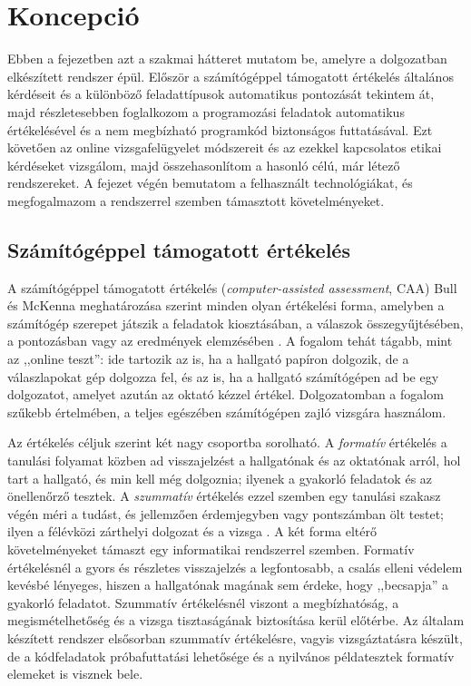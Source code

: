 \chapter{Koncepció}
\label{ch:koncepcio}

Ebben a fejezetben azt a szakmai hátteret mutatom be, amelyre a dolgozatban elkészített rendszer
épül. Először a számítógéppel támogatott értékelés általános kérdéseit és a különböző
feladattípusok automatikus pontozását tekintem át, majd részletesebben foglalkozom a programozási
feladatok automatikus értékelésével és a nem megbízható programkód biztonságos futtatásával.
Ezt követően az online vizsgafelügyelet módszereit és az ezekkel kapcsolatos etikai kérdéseket
vizsgálom, majd összehasonlítom a hasonló célú, már létező rendszereket. A fejezet végén
bemutatom a felhasznált technológiákat, és megfogalmazom a rendszerrel szemben támasztott
követelményeket.

\section{Számítógéppel támogatott értékelés}
\label{sec:caa}

A számítógéppel támogatott értékelés (\textit{computer-assisted assessment}, CAA) Bull és
McKenna meghatározása szerint minden olyan értékelési forma, amelyben a számítógép szerepet
játszik a feladatok kiosztásában, a válaszok összegyűjtésében, a pontozásban vagy az
eredmények elemzésében \cite{bull2004blueprint}. A fogalom tehát tágabb, mint az ,,online teszt'':
ide tartozik az is, ha a hallgató papíron dolgozik, de a válaszlapokat gép dolgozza fel, és az is,
ha a hallgató számítógépen ad be egy dolgozatot, amelyet azután az oktató kézzel értékel.
Dolgozatomban a fogalom szűkebb értelmében, a teljes egészében számítógépen zajló vizsgára
használom.

Az értékelés céljuk szerint két nagy csoportba sorolható. A \textit{formatív} értékelés a
tanulási folyamat közben ad visszajelzést a hallgatónak és az oktatónak arról, hol tart a
hallgató, és min kell még dolgoznia; ilyenek a gyakorló feladatok és az önellenőrző tesztek. A
\textit{szummatív} értékelés ezzel szemben egy tanulási szakasz végén méri a tudást, és
jellemzően érdemjegyben vagy pontszámban ölt testet; ilyen a félévközi zárthelyi dolgozat és a
vizsga \cite{bull2004blueprint}. A két forma eltérő követelményeket támaszt egy informatikai
rendszerrel szemben. Formatív értékelésnél a gyors és részletes visszajelzés a legfontosabb, a
csalás elleni védelem kevésbé lényeges, hiszen a hallgatónak magának sem érdeke, hogy
,,becsapja'' a gyakorló feladatot. Szummatív értékelésnél viszont a megbízhatóság, a
megismételhetőség és a vizsga tisztaságának biztosítása kerül előtérbe. Az általam készített
rendszer elsősorban szummatív értékelésre, vagyis vizsgáztatásra készült, de a kódfeladatok
próbafuttatási lehetősége és a nyilvános példatesztek formatív elemeket is visznek bele.

